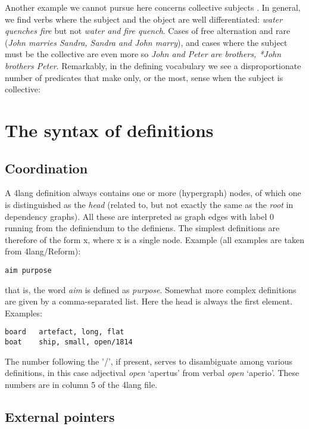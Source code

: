\documentclass[11pt,bookmarks,bookmarksnumbered,naturalnames,plainpages=false,pdftex,colorlinks=true,urlcolor=blue,bookmarksdepth=subsection,plainpages=false]{paper}
\begin{document}
Another example we cannot pursue here concerns collective subjects
\citep{Scha:1981}. In general, we find verbs where the subject and the object
are well differentiated: {\it water quenches fire} but not {\it *water and
  fire quench}. Cases of free alternation and rare ({\it John marries Sandra,
  Sandra and John marry}), and cases where the subject must be the collective
are even more so {\it John and Peter are brothers, *John brothers
  Peter}. Remarkably, in the defining vocabulary we see a disproportionate
number of predicates that make only, or the most, sense when the subject is
collective: %


\section{The syntax of definitions}\label{8thcol}

\subsection{Coordination}\label{comma}

A 4lang definition always contains one or more (hypergraph) nodes, of which
one is distinguished as the {\it head} (related to, but not exactly the same
as the {\it root} in dependency graphs). All these are interpreted as graph
edges with label 0 running from the definiendum to the definiens.  The simplest
definitions are therefore of the form x, where x is a single node. Example
(all examples are taken from 4lang/Reform):

\noindent
{\tt aim   purpose}

\noindent
that is, the word {\it aim} is defined as {\it purpose}. Somewhat more complex
definitions are given by a comma-separated list. Here the head is always the
first element. Examples:

\begin{verbatim}
board   artefact, long, flat    
boat    ship, small, open/1814  
\end{verbatim}

The number following the '/', if present, serves to disambiguate among various
definitions, in this case adjectival {\it open} `apertus' from verbal
{\it open} `aperio'. These numbers are in column 5 of the 4lang file. 

\subsection{External pointers}\label{atsign}
\end{document}
